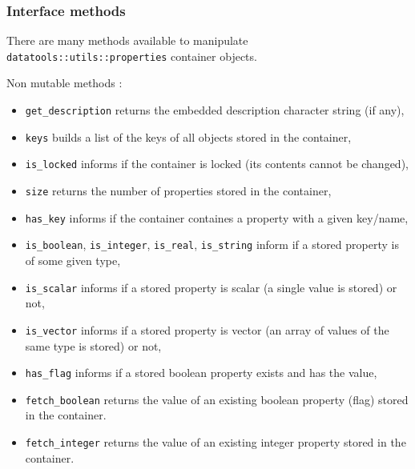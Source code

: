 \subsubsection{Interface methods}

There     are     many     methods     available     to     manipulate
\texttt{datatools::utils::properties} container objects.

\pn Non mutable methods :

\begin{itemize}

\item  \texttt{get\_description}   returns  the  embedded  description
  character string (if any),

\item \texttt{keys} builds a list of the keys of all objects stored in
  the container,

\item  \texttt{is\_locked} informs  if  the container  is locked  (its
  contents cannot be changed),

\item  \texttt{size} returns the  number of  properties stored  in the
  container,

\item \texttt{has\_key} informs if  the container containes a property
  with a given key/name,

\item  \texttt{is\_boolean},  \texttt{is\_integer}, \texttt{is\_real},
  \texttt{is\_string} inform  if a stored  property is of  some given
  type,

\item \texttt{is\_scalar}  informs if a  stored property is  scalar (a
  single value is stored) or not,

\item \texttt{is\_vector}  informs if a stored property  is vector (an
  array of values of the same type is stored) or not,

\item \texttt{has\_flag}  informs if a stored  boolean property exists
  and has the  value,

\item \texttt{fetch\_boolean} returns the value of an existing boolean
  property (flag) stored in the container.
  
\item \texttt{fetch\_integer} returns the value of an existing integer
  property stored in the container.
   

\end{itemize}
